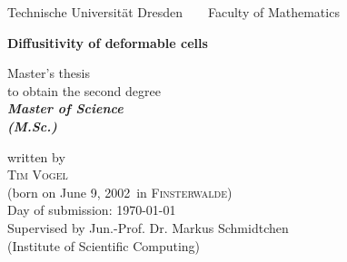 



\newcommand{\name}{Vogel}
\newcommand{\vorname}{Tim}
\newcommand{\gebdatum}{June 9, 2002}
\newcommand{\ort}{Finsterwalde}
\newcommand{\betreuer}{Jun.-Prof. Dr. Markus Schmidtchen}
\newcommand{\institut}{Institute of Scientific Computing}
\newcommand{\thema}{Diffusitivity of deformable cells}
\newcommand{\datum}{\today} %
\newcommand{\studiengang}{Technomathematics}



\thispagestyle{empty}

\begin{center}
{\Large Technische Universit\"{a}t Dresden\  \ \textbullet\ \ Faculty of Mathematics}

\vfil

{\bfseries\Huge\thema}

\vfil
{\LARGE
Master's thesis \\[\bigskipamount]
to obtain the second degree \\[\bigskipamount]
\bfseries{\itshape Master of Science\\
\textup{(}M.Sc.\textup{)}}\\[\bigskipamount]
}



\vfil\vfil

\vfil

written by
\\[\bigskipamount]
\textsc{\vorname} \textsc{\name}
\\[\bigskipamount]
(born on \gebdatum\ in \textsc{\ort})
\\[\bigskipamount]
Day of submission: \datum
\\[\bigskipamount]
Supervised by \betreuer\  \\ (\institut)
\end{center}